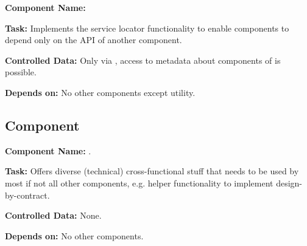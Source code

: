 \textbf{Component Name:} \COMPcomponentRegistry{}

\textbf{Task:} Implements the service locator functionality to enable components to depend only on the API of another component.

\textbf{Controlled Data:} Only via \COMPcomponentRegistry{}, access to metadata about components of \LibName{} is possible.

\textbf{Depends on:} No other components except utility.


\subsection{Component \COMPutility{}}
\label{sec:COMPutility}

\textbf{Component Name:} \COMPutility{}.

\textbf{Task:} Offers diverse (technical) cross-functional stuff that needs to be used by most if not all other components, e.g. helper functionality to implement design-by-contract.

\textbf{Controlled Data:} None.

\textbf{Depends on:} No other components.

%
%



